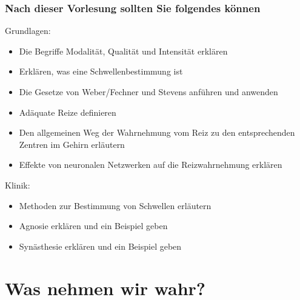 \documentclass[aspectratio=169]{beamer}
\begin{document}
\begin{frame}

 \frametitle{Nach dieser Vorlesung sollten Sie folgendes können}



\begin{block}{Grundlagen:}




\begin{itemize}

    \item 
Die Begriffe Modalität, Qualität und Intensität erklären
    \item 
Erklären, was eine Schwellenbestimmung ist 
    \item 
Die Gesetze von Weber/Fechner und Stevens anführen und anwenden
    \item 
Adäquate Reize definieren
    \item 
Den allgemeinen Weg der Wahrnehmung vom Reiz zu den entsprechenden Zentren im Gehirn erläutern 
    \item 
Effekte von neuronalen Netzwerken auf die Reizwahrnehmung erklären
\end{itemize}


\end{block}



 

\begin{block}{Klinik:}

\begin{itemize}
    
\item 
Methoden zur Bestimmung von Schwellen erläutern 
\item
Agnosie erklären und ein Beispiel geben
\item
Synästhesie erklären und ein Beispiel geben


\end{itemize}


\end{block}



\end{frame}



 

\section{Was nehmen wir wahr?}
\end{document}
